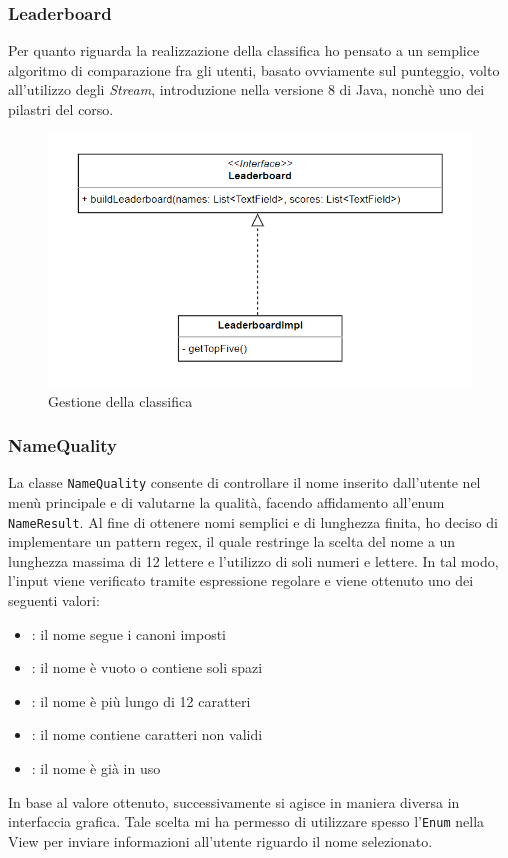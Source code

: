\documentclass[a4paper,12pt]{report}
\begin{document}
\subsubsection{Leaderboard}
Per quanto riguarda la realizzazione della classifica ho pensato a un semplice algoritmo di comparazione fra gli utenti, basato ovviamente sul punteggio, volto all'utilizzo degli \textit{Stream}, introduzione nella versione 8 di Java, nonchè uno dei pilastri del corso. 
\begin{figure}[H]
    \begin{center}
        \centering
        \includegraphics[width=\textwidth]{img/Design/Severi/Leaderboard.png}
    \end{center}
    \caption{Gestione della classifica}
    \label{img:leaderboard}
\end{figure}

\subsubsection{NameQuality}
La classe \texttt{NameQuality} consente di controllare il nome inserito dall'utente nel menù principale e di valutarne la qualità, facendo affidamento all'enum \texttt{NameResult}. Al fine di ottenere nomi semplici e di lunghezza finita, ho deciso di implementare un pattern regex, il quale restringe la scelta del nome a un lunghezza massima di 12 lettere e l'utilizzo di soli numeri e lettere. In tal modo, l'input viene verificato tramite espressione regolare e viene ottenuto uno dei seguenti valori:
\begin{itemize}
    \item {}: il nome segue i canoni imposti
    \item {}: il nome è vuoto o contiene soli spazi
    \item {}: il nome è più lungo di 12 caratteri
    \item {}: il nome contiene caratteri non validi
    \item {}: il nome è già in uso
\end{itemize}
\noindent In base al valore ottenuto, successivamente si agisce in maniera diversa in interfaccia grafica. Tale scelta mi ha permesso di utilizzare spesso l'\texttt{Enum} nella View per inviare informazioni all'utente riguardo il nome selezionato.
\end{document}
